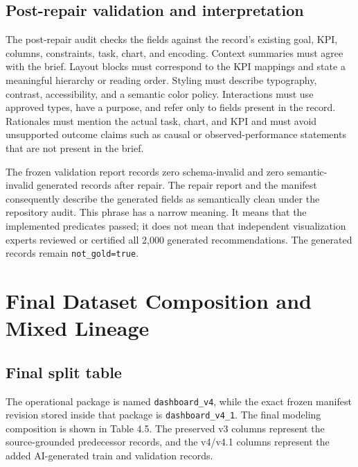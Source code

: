 \subsection{Post-repair validation and interpretation}

The post-repair audit checks the fields against the record's existing goal, KPI, columns, constraints, task, chart, and encoding. Context summaries must agree with the brief. Layout blocks must correspond to the KPI mappings and state a meaningful hierarchy or reading order. Styling must describe typography, contrast, accessibility, and a semantic color policy. Interactions must use approved types, have a purpose, and refer only to fields present in the record. Rationales must mention the actual task, chart, and KPI and must avoid unsupported outcome claims such as causal or observed-performance statements that are not present in the brief.

The frozen validation report records zero schema-invalid and zero semantic-invalid generated records after repair. The repair report and the manifest consequently describe the generated fields as semantically clean under the repository audit. This phrase has a narrow meaning. It means that the implemented predicates passed; it does not mean that independent visualization experts reviewed or certified all 2,000 generated recommendations. The generated records remain \texttt{not\_gold=true}.

\section{Final Dataset Composition and Mixed Lineage}

\subsection{Final split table}

The operational package is named \texttt{dashboard\_v4}, while the exact frozen manifest revision stored inside that package is \texttt{dashboard\_v4\_1}. The final modeling composition is shown in Table 4.5. The preserved v3 columns represent the source-grounded predecessor records, and the v4/v4.1 columns represent the added AI-generated train and validation records.

